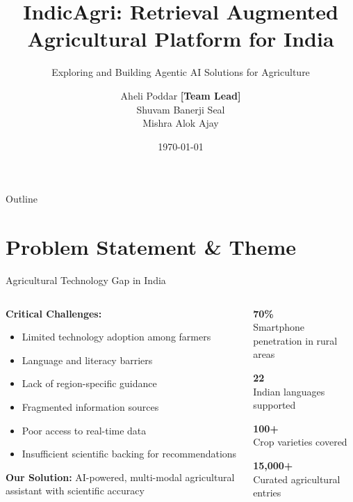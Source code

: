 \documentclass[aspectratio=169]{beamer}
\title[IndicAgri]{IndicAgri: Retrieval Augmented Agricultural Platform for India}
\subtitle{Exploring and Building Agentic AI Solutions for Agriculture}
\author[Team Fibonacci]{Aheli Poddar \textbf{[Team Lead]} \\ Shuvam Banerji Seal \\ Mishra Alok Ajay}
\institute[Capital One]{Capital One Software Engineering Summit}
\date{\today}
\begin{document}
\begin{frame}
\titlepage
\end{frame}

\begin{frame}{Outline}
\tableofcontents[hideallsubsections]
\end{frame}

\section{Problem Statement \& Theme}

\begin{frame}{Agricultural Technology Gap in India}
\begin{columns}
\begin{column}{0.6\textwidth}
\textbf{Critical Challenges:}
\begin{itemize}
\item Limited technology adoption among farmers
\item Language and literacy barriers  
\item Lack of region-specific guidance
\item Fragmented information sources
\item Poor access to real-time data
\item Insufficient scientific backing for recommendations
\end{itemize}

\vspace{0.3cm}
\textbf{Our Solution:} AI-powered, multi-modal agricultural assistant with scientific accuracy
\end{column}
\begin{column}{0.4\textwidth}
\begin{center}
\Large{\textcolor{indicgreen}{\textbf{70\%}}} \\
\small{Smartphone penetration in rural areas}

\vspace{0.3cm}
\Large{\textcolor{indicorange}{\textbf{22}}} \\
\small{Indian languages supported}

\vspace{0.3cm}
\Large{\textcolor{indicblue}{\textbf{100+}}} \\
\small{Crop varieties covered}

\vspace{0.3cm}
\Large{\textcolor{indicpurple}{\textbf{15,000+}}} \\
\small{Curated agricultural entries}
\end{center}
\end{column}
\end{columns}
\end{frame}
\end{document}
